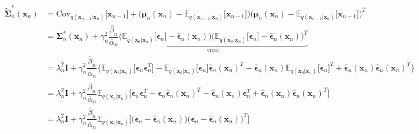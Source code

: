 \documentclass[14pt, a4paper]{article}
\numberwithin{equation}{section}
\numberwithin{figure}{section}
\numberwithin{dl}{section}
\numberwithin{md}{section}
\numberwithin{bd}{section}
\numberwithin{dn}{section}
\numberwithin{hq}{section}
\begin{document}
    \begin{equation*}
        \begin{aligned}
            \tilde{\boldsymbol{\Sigma}}_n^{\ast} (\boldsymbol{x}_n) &= \mathrm{Cov}_{q(\boldsymbol{x}_{n-1} \vert \boldsymbol{x}_n)} \lbrack \boldsymbol{x}_{n-1} \rbrack + \big( \boldsymbol{\mu}_n(\boldsymbol{x}_n) - \mathbb{E}_{q(\boldsymbol{x}_{n-1} \vert \boldsymbol{x}_n)} \lbrack \boldsymbol{x}_{n-1} \rbrack \big)\big( \boldsymbol{\mu}_n(\boldsymbol{x}_n) - \mathbb{E}_{q(\boldsymbol{x}_{n-1} \vert \boldsymbol{x}_n)} \lbrack \boldsymbol{x}_{n-1} \rbrack \big)^T \\
            &= \boldsymbol{\Sigma}_n^{\ast} (\boldsymbol{x}_n) + \gamma_n^2 \dfrac{\overline{\beta}_n}{\overline{\alpha}_n} \underbrace{\big( \mathbb{E}_{q(\boldsymbol{x}_0 \vert \boldsymbol{x}_n)} \lbrack \boldsymbol{\epsilon}_n \rbrack - \hat{\boldsymbol{\epsilon}}_n (\boldsymbol{x}_n) \big)\big( \mathbb{E}_{q(\boldsymbol{x}_0 \vert \boldsymbol{x}_n)} \lbrack \boldsymbol{\epsilon}_n \rbrack - \hat{\boldsymbol{\epsilon}}_n (\boldsymbol{x}_n) \big)^T}_{\mathrm{error}} \\
            &= \lambda_n^2 \boldsymbol{I} + \gamma_n^2 \dfrac{\overline{\beta}_n}{\overline{\alpha}_n} \big \lbrace \mathbb{E}_{q(\boldsymbol{x}_0 \vert \boldsymbol{x}_n)} \lbrack \boldsymbol{\epsilon}_n \boldsymbol{\epsilon}_n^T \rbrack - \mathbb{E}_{q(\boldsymbol{x}_0 \vert \boldsymbol{x}_n)} \lbrack \boldsymbol{\epsilon}_n \rbrack \hat{\boldsymbol{\epsilon}}_n (\boldsymbol{x}_n)^T - \hat{\boldsymbol{\epsilon}}_n (\boldsymbol{x}_n) \mathbb{E}_{q(\boldsymbol{x}_0 \vert \boldsymbol{x}_n)} \lbrack \boldsymbol{\epsilon}_n \rbrack^T + \hat{\boldsymbol{\epsilon}}_n (\boldsymbol{x}_n) \hat{\boldsymbol{\epsilon}}_n (\boldsymbol{x}_n)^T  \big \rbrace \\
            &= \lambda_n^2 \boldsymbol{I} + \gamma_n^2 \dfrac{\overline{\beta}_n}{\overline{\alpha}_n} \mathbb{E}_{q(\boldsymbol{x}_0 \vert \boldsymbol{x}_n)} \big \lbrack \boldsymbol{\epsilon}_n \boldsymbol{\epsilon}_n^T - \boldsymbol{\epsilon}_n \hat{\boldsymbol{\epsilon}}_n (\boldsymbol{x}_n)^T - \hat{\boldsymbol{\epsilon}}_n (\boldsymbol{x}_n) \boldsymbol{\epsilon}_n^T + \hat{\boldsymbol{\epsilon}}_n(\boldsymbol{x}_n) \hat{\boldsymbol{\epsilon}}_n(\boldsymbol{x}_n)^T \big \rbrack \\
            &= \lambda_n^2 \boldsymbol{I} + \gamma_n^2 \dfrac{\overline{\beta}_n}{\overline{\alpha}_n} \mathbb{E}_{q(\boldsymbol{x}_0 \vert \boldsymbol{x}_n)} \big \lbrack \big( \boldsymbol{\epsilon}_n - \hat{\boldsymbol{\epsilon}}_n (\boldsymbol{x}_n) \big) \big( \boldsymbol{\epsilon}_n - \hat{\boldsymbol{\epsilon}}_n (\boldsymbol{x}_n) \big)^T \big \rbrack
        \end{aligned}
    \end{equation*}
\end{document}
